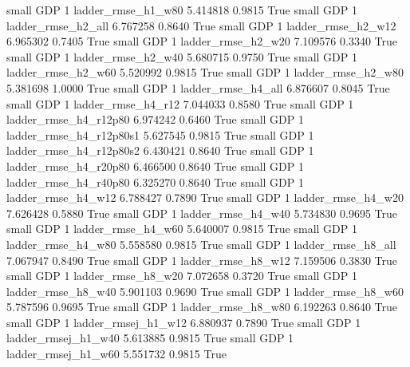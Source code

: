      small      GDP                 1       ladder_rmse_h1_w80   5.414818      0.9815    True
     small      GDP                 1       ladder_rmse_h2_all   6.767258      0.8640    True
     small      GDP                 1       ladder_rmse_h2_w12   6.965302      0.7405    True
     small      GDP                 1       ladder_rmse_h2_w20   7.109576      0.3340    True
     small      GDP                 1       ladder_rmse_h2_w40   5.680715      0.9750    True
     small      GDP                 1       ladder_rmse_h2_w60   5.520992      0.9815    True
     small      GDP                 1       ladder_rmse_h2_w80   5.381698      1.0000    True
     small      GDP                 1       ladder_rmse_h4_all   6.876607      0.8045    True
     small      GDP                 1       ladder_rmse_h4_r12   7.044033      0.8580    True
     small      GDP                 1    ladder_rmse_h4_r12p80   6.974242      0.6460    True
     small      GDP                 1  ladder_rmse_h4_r12p80s1   5.627545      0.9815    True
     small      GDP                 1  ladder_rmse_h4_r12p80s2   6.430421      0.8640    True
     small      GDP                 1    ladder_rmse_h4_r20p80   6.466500      0.8640    True
     small      GDP                 1    ladder_rmse_h4_r40p80   6.325270      0.8640    True
     small      GDP                 1       ladder_rmse_h4_w12   6.788427      0.7890    True
     small      GDP                 1       ladder_rmse_h4_w20   7.626428      0.5880    True
     small      GDP                 1       ladder_rmse_h4_w40   5.734830      0.9695    True
     small      GDP                 1       ladder_rmse_h4_w60   5.640007      0.9815    True
     small      GDP                 1       ladder_rmse_h4_w80   5.558580      0.9815    True
     small      GDP                 1       ladder_rmse_h8_all   7.067947      0.8490    True
     small      GDP                 1       ladder_rmse_h8_w12   7.159506      0.3830    True
     small      GDP                 1       ladder_rmse_h8_w20   7.072658      0.3720    True
     small      GDP                 1       ladder_rmse_h8_w40   5.901103      0.9690    True
     small      GDP                 1       ladder_rmse_h8_w60   5.787596      0.9695    True
     small      GDP                 1       ladder_rmse_h8_w80   6.192263      0.8640    True
     small      GDP                 1      ladder_rmsej_h1_w12   6.880937      0.7890    True
     small      GDP                 1      ladder_rmsej_h1_w40   5.613885      0.9815    True
     small      GDP                 1      ladder_rmsej_h1_w60   5.551732      0.9815    True
